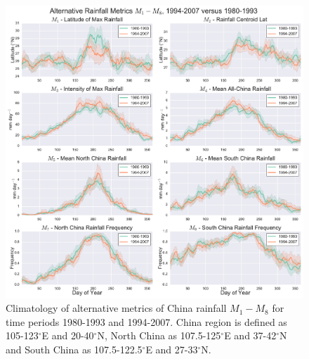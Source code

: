 \documentclass[singlecolumn,11pt]{pnas-new}
\begin{document}
\begin{figure}[htb]
\centering
\includegraphics[width=36pc]{Figures/alternative_metrics_9407_8093}
\caption{Climatology of alternative metrics of China rainfall $M_1-M_8$ for time periods 1980-1993 and 1994-2007. China region is defined as 105-123$^{\circ}$E and 20-40$^{\circ}$N, North China as 107.5-125$^{\circ}$E and 37-42$^{\circ}$N and South China as 107.5-122.5$^{\circ}$E and 27-33$^{\circ}$N.}
\label{fig:alternative_metrics}
\end{figure}
\end{document}
